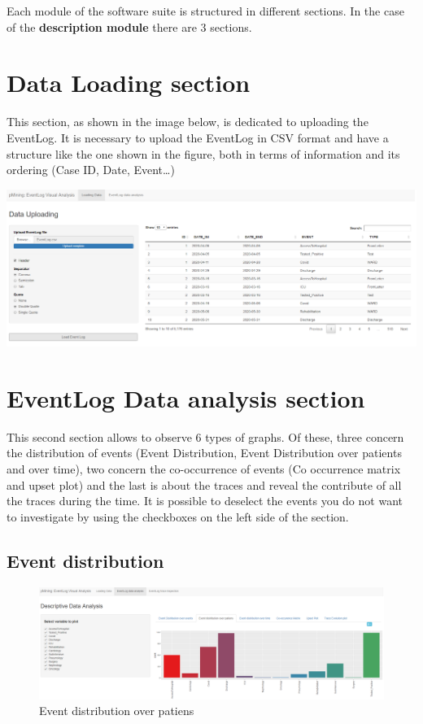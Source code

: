\documentclass[
]{book}
\begin{document}
Each module of the software suite is structured in different sections. In the case of the \textbf{description module} there are 3 sections.

\hypertarget{data-loading-section}{%
\section{Data Loading section}\label{data-loading-section}}

This section, as shown in the image below, is dedicated to uploading the EventLog. It is necessary to upload the EventLog in CSV format and have a structure like the one shown in the figure, both in terms of information and its ordering
(Case ID, Date, Event\ldots)

\includegraphics[width=1\textwidth,height=\textheight]{images/DescrModule.png}

\hypertarget{eventlog-data-analysis-section}{%
\section{EventLog Data analysis section}\label{eventlog-data-analysis-section}}

This second section allows to observe 6 types of graphs. Of these, three concern the distribution of events (Event Distribution, Event Distribution over patients and over time), two concern the co-occurrence of events (Co occurrence matrix and upset plot) and the last is about the traces and reveal the contribute of all the traces during the time.
It is possible to deselect the events you do not want to investigate by using the checkboxes on the left side of the section.

\hypertarget{event-distribution}{%
\subsection{Event distribution}\label{event-distribution}}

\begin{figure}
\centering
\includegraphics[width=1\textwidth,height=\textheight]{images/Visualizzazione1.png}
\caption{Event distribution over patiens}
\end{figure}
\end{document}
